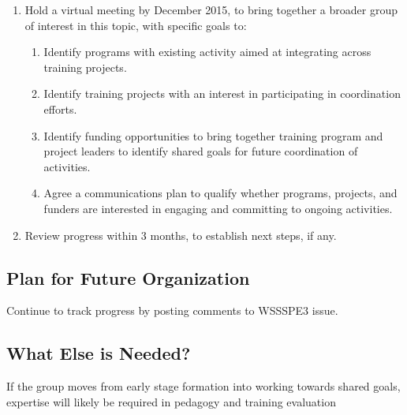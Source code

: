 \begin{enumerate}

\item Hold a virtual meeting by December 2015, to bring together a broader group
of interest in this topic, with specific goals to:

	\begin{enumerate}
	    
	\item Identify programs with existing activity aimed at integrating across
	training projects.
	        
	\item Identify training projects with an interest in participating in
	coordination efforts.
	        
	\item Identify funding opportunities to bring together training program and
	project leaders to identify shared goals for future coordination of activities.
	        
	\item Agree a communications plan to qualify whether programs, projects, and
	funders are interested in engaging and committing to ongoing activities.
	        
	\end{enumerate}
    
\item Review progress within 3 months, to establish next steps, if any.

\end{enumerate}

\subsection{Plan for Future Organization}

Continue to track progress by posting comments to WSSSPE3 issue.

\subsection{What Else is Needed?}

If the group moves from early stage formation into working towards shared goals,
expertise will likely be required in pedagogy and training evaluation

